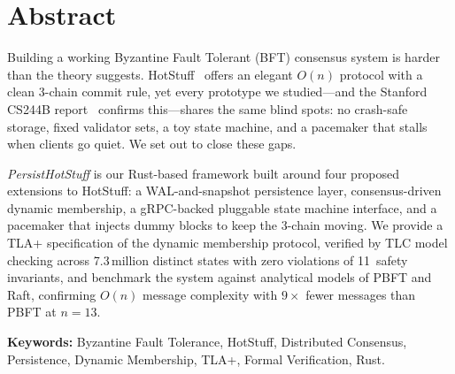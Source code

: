 \chapter*{Abstract}

Building a working Byzantine Fault Tolerant (BFT) consensus system is harder than the theory
suggests.  HotStuff~\cite{hotstuff2019} offers an elegant $O(n)$
protocol with a clean 3-chain commit rule, yet every prototype we
studied---and the Stanford CS244B report~\cite{stanford_hotstuff2024}
confirms this---shares the same blind spots: no crash-safe storage,
fixed validator sets, a toy state machine, and a pacemaker that stalls
when clients go quiet.  We set out to close these gaps.

\textit{PersistHotStuff} is our Rust-based framework built around four
proposed extensions to HotStuff: a WAL-and-snapshot persistence layer,
consensus-driven dynamic membership, a gRPC-backed pluggable state
machine interface, and a pacemaker that injects dummy blocks to keep
the 3-chain moving.
We provide a TLA+ specification of the dynamic membership protocol,
verified by TLC model checking across 7.3\,million distinct states with
zero violations of 11~safety invariants, and benchmark the system
against analytical models of PBFT and Raft, confirming $O(n)$ message
complexity with $9\times$ fewer messages than PBFT at $n{=}13$.

\smallskip
\noindent\textbf{Keywords:}
Byzantine Fault Tolerance, HotStuff, Distributed Consensus, Persistence,
Dynamic Membership, TLA+, Formal Verification, Rust.
